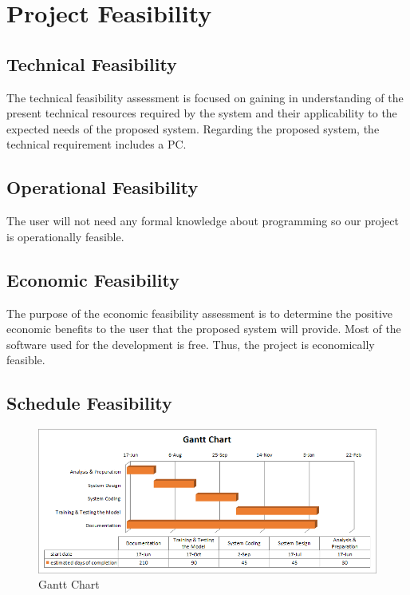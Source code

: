 \section{Project Feasibility}
\vspace{-18pt}
\subsection{Technical Feasibility}
\vspace{-18pt}
The technical feasibility assessment is focused on gaining in understanding of the present technical resources required by the system and their applicability to the expected needs of the proposed system. Regarding the proposed system, the technical requirement includes a PC.
\vspace{-18pt}
\subsection{Operational Feasibility}
\vspace{-18pt}
The user will not need any formal knowledge about programming so our project is operationally feasible.
\vspace{-18pt}
\subsection{Economic Feasibility}
\vspace{-18pt}
The purpose of the economic feasibility assessment is to determine the positive economic benefits to the user that the proposed system will provide. Most of the software used for the development is free. Thus, the project is economically feasible.
\vspace{-18pt}
\subsection{Schedule Feasibility}
\begin{figure}[!h] %
\begin{center}
	\includegraphics[width=6in]{images/gc2.png} 
	\caption{Gantt Chart} %
	\label{figGanttChart} %
\end{center}
\end{figure}

